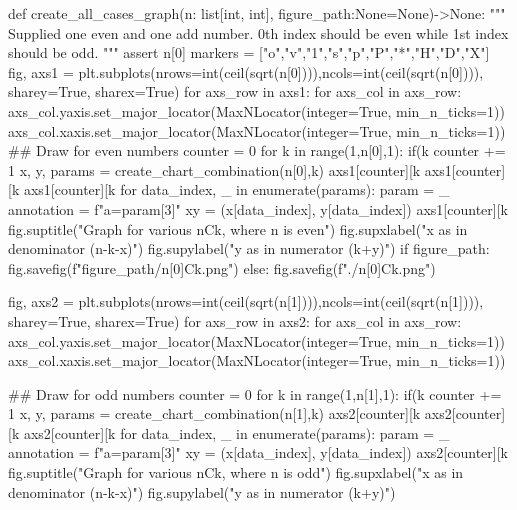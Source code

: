 \documentclass[10pt, twoside]{article}
\begin{document}
\begin{appendices}
\begin{python}
{def create_all_cases_graph(n: list[int, int], figure_path:None=None)->None:
    """
    Supplied one even and one add number. 0th index should be even while 1st index should be odd.
    """
    assert n[0]%
    markers = ["o","v","1","s","p","P","*","H","D","X"]
    fig, axs1 = plt.subplots(nrows=int(ceil(sqrt(n[0]))),ncols=int(ceil(sqrt(n[0]))), sharey=True, sharex=True)
    for axs_row in axs1:
        for axs_col in axs_row:
            axs_col.yaxis.set_major_locator(MaxNLocator(integer=True, min_n_ticks=1))
            axs_col.xaxis.set_major_locator(MaxNLocator(integer=True, min_n_ticks=1))
    ## Draw for even numbers
    counter = 0
    for k in range(1,n[0],1):
        if(k%
            counter += 1        
        x, y, params = create_chart_combination(n[0],k)
        axs1[counter][k%
        axs1[counter][k%
        axs1[counter][k%
        for data_index, _ in enumerate(params):
            param = _
            annotation = f"a={param[3]}"
            xy = (x[data_index], y[data_index])
            axs1[counter][k%
    fig.suptitle("Graph for various nCk, where n is even")
    fig.supxlabel("x as in denominator (n-k-x)")
    fig.supylabel("y as in numerator (k+y)")
    if figure_path:
        fig.savefig(f"{figure_path}/{n[0]}Ck.png")
    else:
        fig.savefig(f"./{n[0]}Ck.png")

    fig, axs2 = plt.subplots(nrows=int(ceil(sqrt(n[1]))),ncols=int(ceil(sqrt(n[1]))), sharey=True, sharex=True)
    for axs_row in axs2:
        for axs_col in axs_row:
            axs_col.yaxis.set_major_locator(MaxNLocator(integer=True, min_n_ticks=1))
            axs_col.xaxis.set_major_locator(MaxNLocator(integer=True, min_n_ticks=1))

    ## Draw for odd numbers
    counter = 0
    for k in range(1,n[1],1):
        if(k%
            counter += 1        
        x, y, params = create_chart_combination(n[1],k)
        axs2[counter][k%
        axs2[counter][k%
        axs2[counter][k%
        for data_index, _ in enumerate(params):
            param = _
            annotation = f"a={param[3]}"
            xy = (x[data_index], y[data_index]) 
            axs2[counter][k%
    fig.suptitle("Graph for various nCk, where n is odd")
    fig.supxlabel("x as in denominator (n-k-x)")
    fig.supylabel("y as in numerator (k+y)")

}
\end{python}
\end{appendices}
\end{document}
